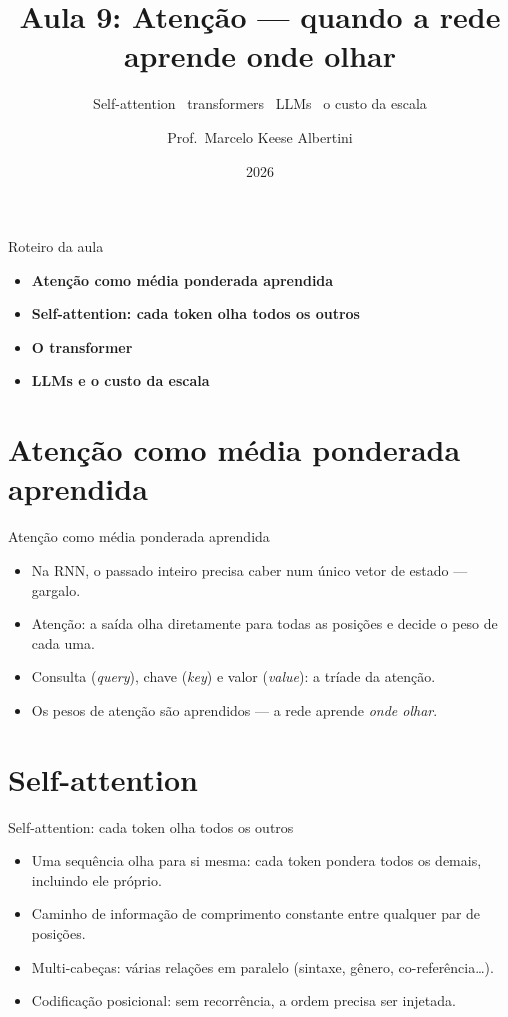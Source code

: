 \documentclass[aspectratio=169, 11pt]{beamer}
\title[Aula 9 — Atenção]{Aula 9: Atenção — quando a rede aprende onde olhar}
\subtitle[GBC073 — Inteligência Computacional]{Self-attention \textbullet\ transformers \textbullet\ LLMs \textbullet\ o custo da escala}
\author[Prof.\ Marcelo Albertini]{Prof.\ Marcelo Keese Albertini}
\institute{GBC073 — Inteligência Computacional \textbullet\ Universidade Federal de Uberlândia}
\date{2026}
\begin{document}
\begin{frame}
  \titlepage
\end{frame}

\begin{frame}{Roteiro da aula}
  \begin{itemize}\setlength{\itemsep}{0.5ex}
    \item<1-> \textbf{Atenção como média ponderada aprendida}
    \item<2-> \textbf{Self-attention: cada token olha todos os outros}
    \item<3-> \textbf{O transformer}
    \item<4-> \textbf{LLMs e o custo da escala}
  \end{itemize}
\end{frame}

\section{Atenção como média ponderada aprendida}

\begin{frame}{Atenção como média ponderada aprendida}
  \begin{itemize}\setlength{\itemsep}{0.4ex}
    \item Na RNN, o passado inteiro precisa caber num único vetor de estado —
          gargalo.
    \item Atenção: a saída olha diretamente para todas as posições e decide
          o peso de cada uma.
    \item Consulta (\emph{query}), chave (\emph{key}) e valor (\emph{value}):
          a tríade da atenção.
    \item Os pesos de atenção são aprendidos — a rede aprende \emph{onde olhar}.
  \end{itemize}
\end{frame}

\section{Self-attention}

\begin{frame}{Self-attention: cada token olha todos os outros}
  \begin{itemize}\setlength{\itemsep}{0.4ex}
    \item Uma sequência olha para si mesma: cada token pondera todos os
          demais, incluindo ele próprio.
    \item Caminho de informação de comprimento constante entre qualquer par
          de posições.
    \item Multi-cabeças: várias relações em paralelo (sintaxe, gênero,
          co-referência\ldots).
    \item Codificação posicional: sem recorrência, a ordem precisa ser
          injetada.
  \end{itemize}
\end{frame}
\end{document}
